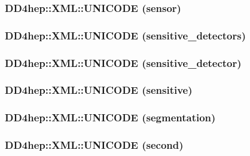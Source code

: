 \hypertarget{namespace_d_d4hep_1_1_x_m_l_af87cf432f8b3a6489e2801dec68d6020}{
\subsubsection[{UNICODE}]{\setlength{\rightskip}{0pt plus 5cm}DD4hep::XML::UNICODE (sensor)}}
\label{namespace_d_d4hep_1_1_x_m_l_af87cf432f8b3a6489e2801dec68d6020}
\hypertarget{namespace_d_d4hep_1_1_x_m_l_a032cb38ff12c06d77a6f79b3a6930311}{
\subsubsection[{UNICODE}]{\setlength{\rightskip}{0pt plus 5cm}DD4hep::XML::UNICODE (sensitive\_\-detectors)}}
\label{namespace_d_d4hep_1_1_x_m_l_a032cb38ff12c06d77a6f79b3a6930311}
\hypertarget{namespace_d_d4hep_1_1_x_m_l_a9d2bf762671cf86615c9485017775a97}{
\subsubsection[{UNICODE}]{\setlength{\rightskip}{0pt plus 5cm}DD4hep::XML::UNICODE (sensitive\_\-detector)}}
\label{namespace_d_d4hep_1_1_x_m_l_a9d2bf762671cf86615c9485017775a97}
\hypertarget{namespace_d_d4hep_1_1_x_m_l_af887183aa9381edbe8e0c6e0d65d07c0}{
\subsubsection[{UNICODE}]{\setlength{\rightskip}{0pt plus 5cm}DD4hep::XML::UNICODE (sensitive)}}
\label{namespace_d_d4hep_1_1_x_m_l_af887183aa9381edbe8e0c6e0d65d07c0}
\hypertarget{namespace_d_d4hep_1_1_x_m_l_a9c87e5f51620bde064e5301d0d7e8191}{
\subsubsection[{UNICODE}]{\setlength{\rightskip}{0pt plus 5cm}DD4hep::XML::UNICODE (segmentation)}}
\label{namespace_d_d4hep_1_1_x_m_l_a9c87e5f51620bde064e5301d0d7e8191}
\hypertarget{namespace_d_d4hep_1_1_x_m_l_a3093c361a4ebe4730215c79afec7b7ab}{
\subsubsection[{UNICODE}]{\setlength{\rightskip}{0pt plus 5cm}DD4hep::XML::UNICODE (second)}}
